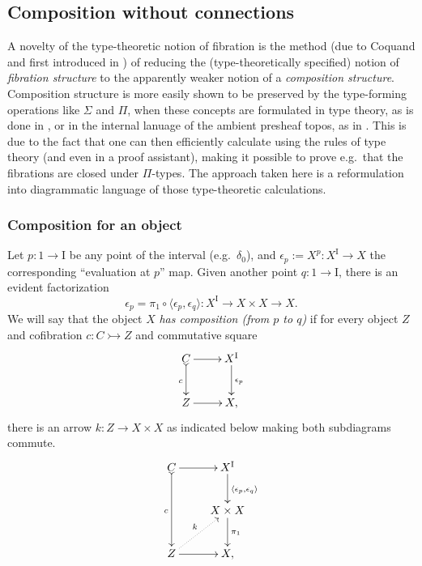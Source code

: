 \documentclass[12pt]{article}
\newcommand{\mono}{\ensuremath{\rightarrowtail}}
\newcommand{\ra}{\ensuremath{\rightarrow}}
\newcommand{\I}{\ensuremath{\mathrm{I}}}
\theoremstyle{remark}
\theoremstyle{definition}
\begin{document}
\subsection{Composition without connections}\label{sec:composition}

A novelty of the type-theoretic notion of fibration is the method (due to Coquand and first introduced in \cite{CCHM}) of reducing the (type-theoretically specified) notion of \emph{fibration structure} to the apparently weaker notion of a \emph{composition structure}.  Composition structure is more easily shown to be preserved by the type-forming operations like $\Sigma$ and $\Pi$, when these concepts are formulated in type theory, as is done in \cite{CCHM}, or in the internal lanuage of the ambient presheaf topos, as in \cite{OP}.  This is due to the fact that one can then efficiently calculate using the rules of type theory (and even in a proof assistant), making it possible to prove e.g.\  that the fibrations are closed under $\Pi$-types.  The approach taken here is a reformulation into diagrammatic language of those type-theoretic calculations.

\subsubsection*{Composition for an object}

Let $p : 1 \ra \I$ be any point of the interval (e.g.\ $\delta_0$), and $\epsilon_p := X^p : X^\I \ra X$ the corresponding ``evaluation at $p$'' map.  Given another point $q : 1 \ra \I$, there is an evident factorization 
\[
\epsilon_p = \pi_1 \circ \langle \epsilon_p, \epsilon_q\rangle : X^\I \ra X\times X \ra X.
\]
We will say that the object $X$ \emph{has composition (from $p$ to $q$)} if for every object $Z$ and cofibration $c:C\mono Z$ and commutative square 
\begin{equation}\label{diagram:composition1}
\xymatrix{
C \ar@{>->}[d]_{c} \ar[r]  & X^\I \ar[d]^{\epsilon_p} \\
Z \ar[r] & X,
}
\end{equation}
there is an arrow $k : Z \ra X\times X$ as indicated below making both subdiagrams commute.
\begin{equation}\label{diagram:composition2}
\xymatrix{
C \ar@{>->}[dd]_{c} \ar[r]  & X^\I \ar[d]^{\langle \epsilon_p, \epsilon_q\rangle} \\
& X\times X \ar[d]^{\pi_1} \\
Z \ar[r] \ar@{..>}[ru]^{k} & X,
}
\end{equation}
\end{document}
